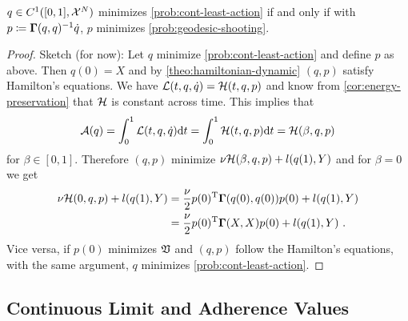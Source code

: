 \begin{theorem}
\label{theo:geodesic-shooting}
	$q \in C^1([0, 1], \mathcal{X}^N)$ minimizes \cref{prob:cont-least-action} if and only if with $p\coloneqq \mathbf{\Gamma}(q, q)^{-1}\dot{q}$, $p$ minimizes \cref{prob:geodesic-shooting}.
\end{theorem}
\begin{proof}
	Sketch (for now):
	Let $q$ minimize \cref{prob:cont-least-action} and define $p$ as above.
	Then $q(0) = X$ and by \cref{theo:hamiltonian-dynamic} $(q, p)$ satisfy Hamilton's equations.
	We have $\mathcal{L}(t, q, \dot{q}) = \mathcal{H}(t, q, p)$ and know from \cref{cor:energy-preservation} that $\mathcal{H}$ is constant across time.
	This implies that
	\begin{equation}
		\mathcal{A}(q) = \int_{0}^{1} \mathcal{L}(t, q, \dot{q}) \mathrm{d}t 
		= \int_{0}^{1} \mathcal{H}(t, q, p) \mathrm{d}t = \mathcal{H}(\beta, q, p)
	\end{equation}
	for $\beta \in [0, 1]$.
	Therefore $(q, p)$ minimize $\nu \mathcal{H}(\beta, q, p) + l(q(1), Y)$ and for $\beta = 0$ we get
	\begin{align}
		\nu \mathcal{H}(0, q, p) + l(q(1), Y) &= \frac{\nu}{2} p(0)^{\mathrm{T}} \mathbf{\Gamma}(q(0), q(0))p(0) + l(q(1), Y)\\
		&= \frac{\nu}{2} p(0)^{\mathrm{T}} \mathbf{\Gamma}(X, X)p(0) + l(q(1), Y) \ .
	\end{align}
	Vice versa, if $p(0)$ minimizes $\mathfrak{V}$ and $(q, p)$ follow the Hamilton's equations, with the same argument, $q$ minimizes \cref{prob:cont-least-action}.
\end{proof}

\subsection{Continuous Limit and Adherence Values}

